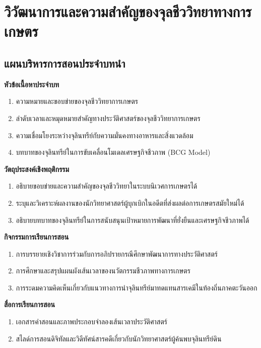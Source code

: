 \chapter{วิวัฒนาการและความสำคัญของจุลชีววิทยาทางการเกษตร}
\label{chap:intro}

\section*{แผนบริหารการสอนประจำบทนำ}

\noindent\textbf{หัวข้อเนื้อหาประจำบท}
\begin{enumerate}
    \item ความหมายและขอบข่ายของจุลชีววิทยาการเกษตร
    \item ลำดับเวลาและหมุดหมายสำคัญทางประวัติศาสตร์ของจุลชีววิทยาการเกษตร
    \item ความเชื่อมโยงระหว่างจุลินทรีย์กับความมั่นคงทางอาหารและสิ่งแวดล้อม
    \item บทบาทของจุลินทรีย์ในการขับเคลื่อนโมเดลเศรษฐกิจชีวภาพ (BCG Model)
\end{enumerate}

\noindent\textbf{วัตถุประสงค์เชิงพฤติกรรม}
\begin{enumerate}
    \item อธิบายขอบข่ายและความสำคัญของจุลชีววิทยาในระบบนิเวศการเกษตรได้
    \item ระบุและวิเคราะห์ผลงานของนักวิทยาศาสตร์ผู้บุกเบิกในอดีตที่ส่งผลต่อการเกษตรสมัยใหม่ได้
    \item อธิบายบทบาทของจุลินทรีย์ในการสนับสนุนเป้าหมายการพัฒนาที่ยั่งยืนและเศรษฐกิจชีวภาพได้
\end{enumerate}

\noindent\textbf{กิจกรรมการเรียนการสอน}
\begin{enumerate}
    \item การบรรยายเชิงวิชาการร่วมกับการอภิปรายกรณีศึกษาพัฒนาการทางประวัติศาสตร์
    \item การศึกษาและสรุปแผนผังเส้นเวลาของนวัตกรรมชีวภาพทางการเกษตร
    \item การระดมความคิดเห็นเกี่ยวกับแนวทางการนำจุลินทรีย์มาทดแทนสารเคมีในท้องถิ่นภาคตะวันออก
\end{enumerate}

\noindent\textbf{สื่อการเรียนการสอน}
\begin{enumerate}
    \item เอกสารคำสอนและภาพประกอบจำลองเส้นเวลาประวัติศาสตร์
    \item สไลด์การสอนดิจิทัลและวิดีทัศน์สารคดีเกี่ยวกับนักวิทยาศาสตร์ผู้ค้นพบจุลินทรีย์ดิน
\end{enumerate}

